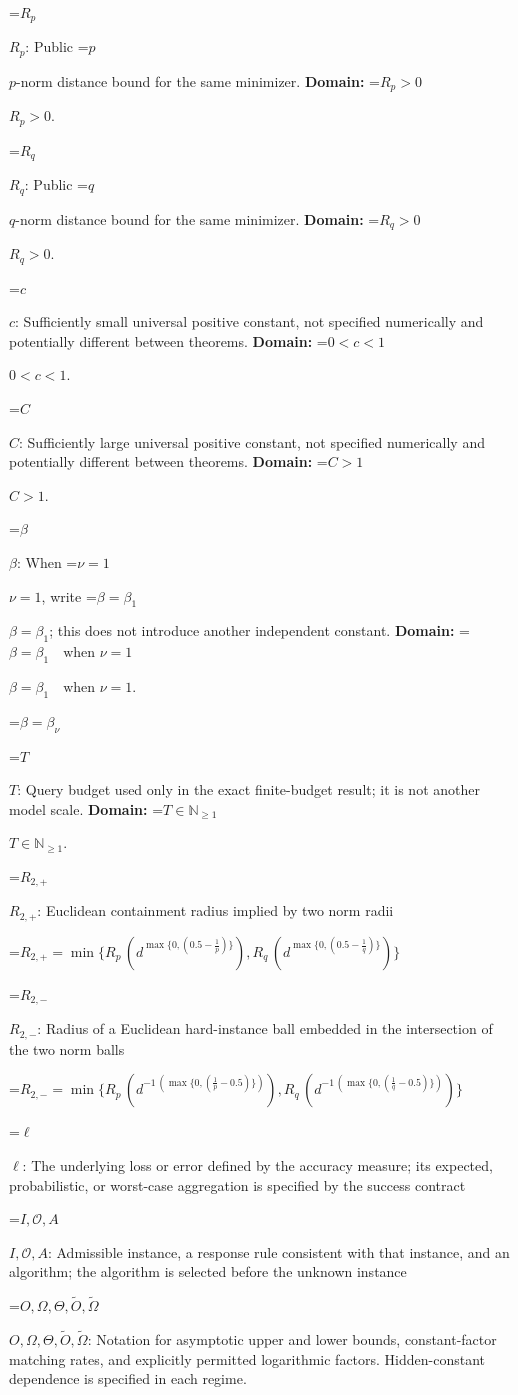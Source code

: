 \documentclass[10pt,a4paper]{article}
\newcommand{\AtlasMath}[1]{\par\begingroup\centering\setbox0=\hbox{$\displaystyle #1$}\ifdim\wd0>1.4\linewidth\typeout{ATLAS WIDE FORMULA: \the\wd0}\fi\ifdim\wd0>\linewidth\resizebox{\linewidth}{!}{\box0}\else\box0\fi\par\endgroup}
\newcommand{\AtlasInlineMath}[1]{\begingroup\setbox0=\hbox{$#1$}\ifdim\wd0>.4\linewidth\endgroup\AtlasMath{#1}\else\endgroup$#1$\fi}
\begin{document}
\AtlasInlineMath{R_p}: Public \AtlasInlineMath{p}-norm distance bound for the same minimizer. \textbf{Domain:} \AtlasInlineMath{R_p>0}.

\AtlasInlineMath{R_q}: Public \AtlasInlineMath{q}-norm distance bound for the same minimizer. \textbf{Domain:} \AtlasInlineMath{R_q>0}.

\AtlasInlineMath{c}: Sufficiently small universal positive constant, not specified numerically and potentially different between theorems. \textbf{Domain:} \AtlasInlineMath{0<c<1}.

\AtlasInlineMath{C}: Sufficiently large universal positive constant, not specified numerically and potentially different between theorems. \textbf{Domain:} \AtlasInlineMath{C>1}.

\AtlasInlineMath{\beta}: When \AtlasInlineMath{\nu=1}, write \AtlasInlineMath{\beta=\beta_1}; this does not introduce another independent constant. \textbf{Domain:} \AtlasInlineMath{\beta=\beta_1\quad\text{when }\nu=1}.


\AtlasMath{\beta=\beta_\nu}


\AtlasInlineMath{T}: Query budget used only in the exact finite-budget result; it is not another model scale. \textbf{Domain:} \AtlasInlineMath{T\in\mathbb{N}_{\ge1}}.

\AtlasInlineMath{R_{2,+}}: Euclidean containment radius implied by two norm radii


\AtlasMath{R_{2,+}=\min\{R_p\,({d}^{\max\{0,(0.5-\frac{1}{p})\}}),R_q\,({d}^{\max\{0,(0.5-\frac{1}{q})\}})\}}


\AtlasInlineMath{R_{2,-}}: Radius of a Euclidean hard-instance ball embedded in the intersection of the two norm balls


\AtlasMath{R_{2,-}=\min\{R_p\,({d}^{-1\,(\max\{0,(\frac{1}{p}-0.5)\})}),R_q\,({d}^{-1\,(\max\{0,(\frac{1}{q}-0.5)\})})\}}


\AtlasInlineMath{\ell}: The underlying loss or error defined by the accuracy measure; its expected, probabilistic, or worst-case aggregation is specified by the success contract

\AtlasInlineMath{I,\mathcal{O},A}: Admissible instance, a response rule consistent with that instance, and an algorithm; the algorithm is selected before the unknown instance

\AtlasInlineMath{O,\Omega,\Theta,\widetilde{O},\widetilde\Omega}: Notation for asymptotic upper and lower bounds, constant-factor matching rates, and explicitly permitted logarithmic factors. Hidden-constant dependence is specified in each regime.
\end{document}
